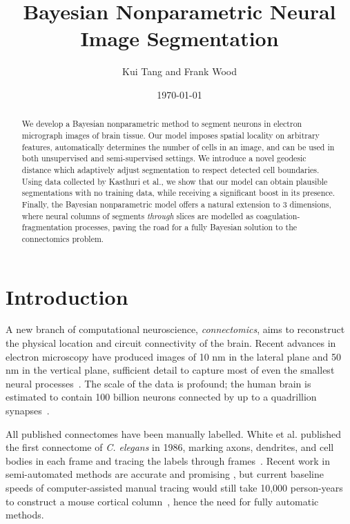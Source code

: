 \documentclass[english]{article}
\newcommand{\+}[1]{\ensuremath{\boldsymbol{\mathrm{#1}}}}
\begin{document}
\listoffixmes

\title{Bayesian Nonparametric Neural Image Segmentation}
\author{Kui Tang and Frank Wood}
\date{\today}
\maketitle
\begin{abstract}
We develop a Bayesian nonparametric method to segment neurons in electron micrograph images of brain tissue. Our model imposes spatial locality on arbitrary features, automatically determines the number of cells in an image, and can be used in both unsupervised and semi-supervised settings. We introduce a novel geodesic distance which adaptively adjust segmentation to respect detected cell boundaries. Using data collected by Kasthuri et al., we show that our model can obtain plausible segmentations with no training data, while receiving a significant boost in its presence. Finally, the Bayesian nonparametric model offers a natural extension to 3 dimensions, where neural columns of segments \emph{through} slices are modelled as coagulation-fragmentation processes, paving the road for a fully Bayesian solution to the connectomics problem.
\end{abstract}

\section{Introduction}
A new branch of computational neuroscience, \emph{connectomics}, aims to reconstruct the physical location and circuit connectivity of the brain. Recent advances in electron microscopy have produced images of 10 nm in the lateral plane and 50 nm in the vertical plane, sufficient detail to capture most of even the smallest neural processes~\cite{Briggman2006}. The scale of the data is profound; the human brain is estimated to contain 100 billion neurons connected by up to a quadrillion synapses~\cite{Kasthuri2010}.

All published connectomes have been manually labelled. White et al. published the first connectome of \emph{C. elegans} in 1986, marking axons, dendrites, and cell bodies in each frame and tracing the labels through frames~\cite{White12111986}. Recent work in semi-automated methods are accurate and promising \cite{Roberts2011,Unger2009,Jarrell2012,Bock2011}, but current baseline speeds of computer-assisted manual tracing would still take 10,000 person-years to construct a mouse cortical column~\cite{Briggman2006}, hence the need for fully automatic methods.
\end{document}
